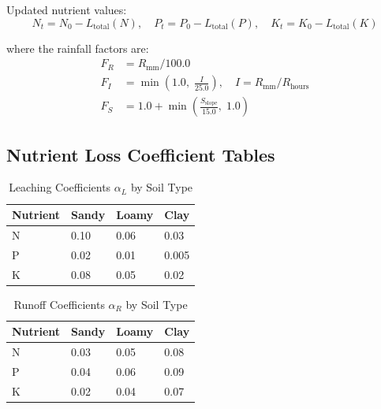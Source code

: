 \documentclass[conference]{IEEEtran}
\begin{document}
Updated nutrient values:
\begin{equation}
  N_t = N_0 - L_{\mathrm{total}}(N), \quad
  P_t = P_0 - L_{\mathrm{total}}(P), \quad
  K_t = K_0 - L_{\mathrm{total}}(K)
  \label{eq:update}
\end{equation}

where the rainfall factors are:
\begin{align}
  F_R &= R_{\mathrm{mm}} / 100.0
  \label{eq:fr} \\
  F_I &= \min\!\left(1.0,\; \frac{I}{25.0}\right), \quad
         I = R_{\mathrm{mm}} / R_{\mathrm{hours}}
  \label{eq:fi} \\
  F_S &= 1.0 + \min\!\left(\frac{S_{\mathrm{slope}}}{15.0},\; 1.0\right)
  \label{eq:fs}
\end{align}

\subsection{Nutrient Loss Coefficient Tables}

\begin{table}[htbp]
\caption{Leaching Coefficients $\alpha_L$ by Soil Type}
\label{tab:leach}
\centering
\renewcommand{\arraystretch}{1.1}
\begin{tabular}{p{2.0cm}p{1.8cm}p{1.8cm}p{1.8cm}}
\toprule
\textbf{Nutrient} & \textbf{Sandy} & \textbf{Loamy} & \textbf{Clay} \\
\midrule
N & 0.10 & 0.06 & 0.03 \\
P & 0.02 & 0.01 & 0.005 \\
K & 0.08 & 0.05 & 0.02 \\
\bottomrule
\end{tabular}
\end{table}

\begin{table}[htbp]
\caption{Runoff Coefficients $\alpha_R$ by Soil Type}
\label{tab:runoff}
\centering
\renewcommand{\arraystretch}{1.1}
\begin{tabular}{p{2.0cm}p{1.8cm}p{1.8cm}p{1.8cm}}
\toprule
\textbf{Nutrient} & \textbf{Sandy} & \textbf{Loamy} & \textbf{Clay} \\
\midrule
N & 0.03 & 0.05 & 0.08 \\
P & 0.04 & 0.06 & 0.09 \\
K & 0.02 & 0.04 & 0.07 \\
\bottomrule
\end{tabular}
\end{table}
\end{document}
